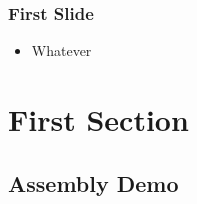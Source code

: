 \documentclass{i20lecture}
\subtitle{Session 0}
\begin{document}
\frame{\titlepage}


\begin{frame}
  \frametitle{First Slide}

  \begin{itemize}
    \item Whatever
  \end{itemize}

\end{frame}

\section{First Section}
\subsection{Assembly Demo}
\end{document}
